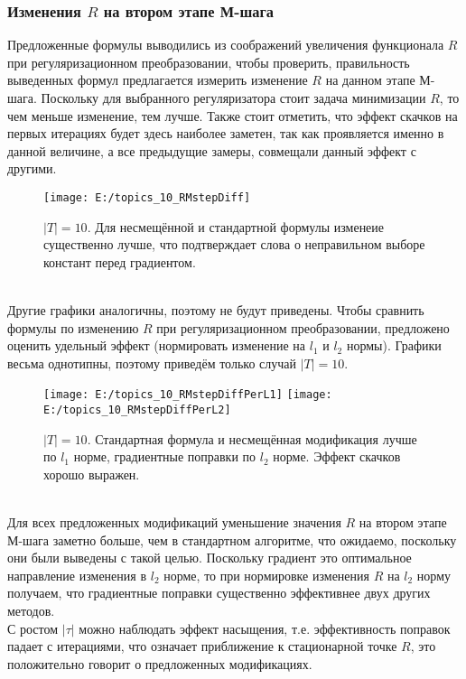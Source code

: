 \documentclass[12pt]{article}
\begin{document}
\subsubsection{Изменения $R$ на втором этапе М-шага}
Предложенные формулы выводились из соображений увеличения функционала $R$ при регуляризационном преобразовании, чтобы проверить, правильность выведенных формул предлагается измерить изменение $R$ на данном этапе М-шага. Поскольку для выбранного регуляризатора стоит задача минимизации $R$, то чем меньше изменение, тем лучше. Также стоит отметить, что эффект скачков на первых итерациях будет здесь наиболее заметен, так как проявляется именно в данной величине, а все предыдущие замеры, совмещали данный эффект с другими.
\begin{figure}[H]
	\centering
	\caption{$|T| = 10$. Для несмещённой и стандартной формулы изменеие существенно лучше, что подтверждает слова о неправильном выборе констант перед градиентом.}    
	\texttt{[image: E:/topics\_10\_RMstepDiff]}
\end{figure}
\ \\
Другие графики аналогичны, поэтому не будут приведены. Чтобы сравнить формулы по изменению $R$ при регуляризационном преобразовании, предложено оценить удельный эффект (нормировать изменение на $l_1$ и $l_2$ нормы). Графики весьма однотипны, поэтому приведём только случай $|T| = 10$.

\begin{figure}[H]
	\centering
	\caption{$|T| = 10$. Стандартная формула и несмещённая модификация лучше по $l_1$ норме, градиентные поправки по $l_2$ норме. Эффект скачков хорошо выражен.}    
	\texttt{[image: E:/topics\_10\_RMstepDiffPerL1]}
	\texttt{[image: E:/topics\_10\_RMstepDiffPerL2]}
\end{figure}
\ \\
Для всех предложенных модификаций уменьшение значения $R$ на втором этапе М-шага заметно больше, чем в стандартном алгоритме, что ожидаемо, поскольку они были выведены с такой целью. Поскольку градиент это оптимальное направление изменения в $l_2$ норме, то при нормировке изменения $R$ на $l_2$ норму получаем, что градиентные поправки существенно эффективнее двух других методов.\\
С ростом $|\tau|$ можно наблюдать эффект насыщения, т.е. эффективность поправок падает с итерациями, что означает приближение к стационарной точке $R$, это положительно говорит о предложенных модификациях.
\end{document}
